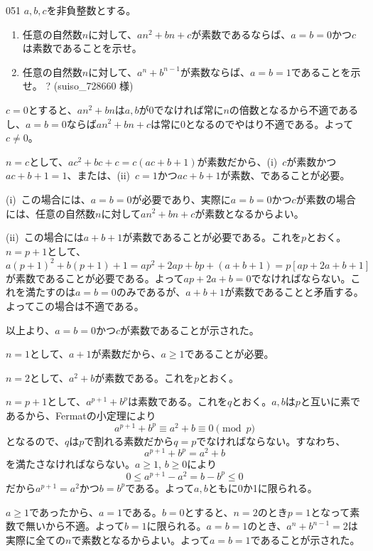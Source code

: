 \begin{thm}{051}{}{}
 $a, b, c$を非負整数とする。
 \begin{enumerate}
  \item 任意の自然数$n$に対して、$an^2+bn+c$が素数であるならば、$a=b=0$かつ$c$は素数であることを示せ。 
  \item 任意の自然数$n$に対して、$a^n+b^{n-1}$が素数ならば、$a=b=1$であることを示せ。 \hosi ? (suiso\_728660 様)
 \end{enumerate}
\end{thm}

$c=0$とすると、$an^2+bn$は$a, b$が0でなければ常に$n$の倍数となるから不適であるし、$a=b=0$ならば$an^2+bn+c$は常に0となるのでやはり不適である。よって$c\neq 0$。

$n=c$として、$ac^2+bc+c=c(ac+b+1)$が素数だから、(i)~$c$が素数かつ$ac+b+1=1$、または、(ii)~$c=1$かつ$ac+b+1$が素数、であることが必要。

(i)~この場合には、$a=b=0$が必要であり、実際に$a=b=0$かつ$c$が素数の場合には、任意の自然数$n$に対して$an^2+bn+c$が素数となるからよい。

(ii)~この場合には$a+b+1$が素数であることが必要である。これを$p$とおく。$n=p+1$として、
\[ a(p+1)^2+b(p+1)+1=ap^2+2ap+bp+(a+b+1)=p\left[ap+2a+b+1\right] \]
が素数であることが必要である。よって$ap+2a+b=0$でなければならない。これを満たすのは$a=b=0$のみであるが、$a+b+1$が素数であることと矛盾する。よってこの場合は不適である。

以上より、$a=b=0$かつ$c$が素数であることが示された。

$n=1$として、$a+1$が素数だから、$a\ge 1$であることが必要。

$n=2$として、$a^2+b$が素数である。これを$p$とおく。

$n=p+1$として、$a^{p+1}+b^p$は素数である。これを$q$とおく。$a, b$は$p$と互いに素であるから、Fermatの小定理により
\[ a^{p+1}+b^p\equiv a^2+b\equiv 0 \pmod{p} \]
となるので、$q$は$p$で割れる素数だから$q=p$でなければならない。すなわち、
\[ a^{p+1}+b^p=a^2+b \]
を満たさなければならない。$a\ge 1$, $b\ge 0$により
\[ 0\le a^{p+1}-a^2=b-b^p\le 0 \]
だから$a^{p+1}=a^2$かつ$b=b^p$である。よって$a, b$ともに0か1に限られる。

$a\ge 1$であったから、$a=1$である。$b=0$とすると、$n=2$のとき$p=1$となって素数で無いから不適。よって$b=1$に限られる。$a=b=1$のとき、$a^n+b^{n-1}=2$は実際に全ての$n$で素数となるからよい。よって$a=b=1$であることが示された。
